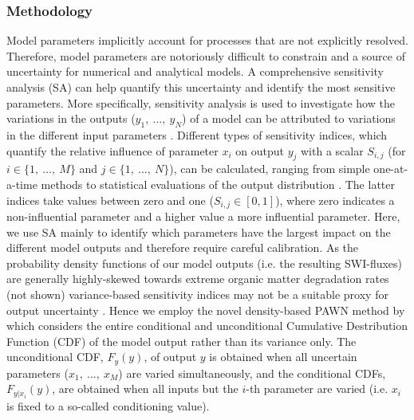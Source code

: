 \documentclass[gmd, manuscript]{copernicus}
\begin{document}
\subsubsection{Methodology}
Model parameters implicitly account for processes that are not explicitly resolved. Therefore, model parameters are notoriously difficult to constrain and a source of uncertainty for numerical and analytical models. 
A comprehensive sensitivity analysis (SA) can help quantify this uncertainty and identify the most sensitive parameters. More specifically, sensitivity analysis is used to investigate how the variations in the outputs 
($y_1,\ ...,\ y_N$) of a model can be attributed to variations in the different input parameters \citep[$x_1,\ ...,\ x_M$,][]{pianosi_sensitivity_2016}. 
Different types of sensitivity indices, which quantify the relative influence of parameter $x_i$ on output $y_j$ with a scalar $S_{i,j}$ 
(for $i \in \{1,\ ...,\ M \}$ and $j \in \{1,\ ...,\ N \}$), can be calculated, ranging from simple one-at-a-time methods to statistical evaluations of the output 
distribution \citep[e.g. variance-based or density-based approaches][]{pianosi_sensitivity_2016}. The latter indices 
take values between zero and one ($S_{i,j} \in [0, 1]$), where zero indicates a non-influential parameter and a higher value a more influential parameter. 
Here, we use SA mainly to identify which parameters have the largest impact on the different model outputs and therefore require careful calibration. 
As the probability density functions of our model outputs (i.e. the resulting SWI-fluxes) are generally highly-skewed towards extreme organic matter degradation rates (not shown) variance-based sensitivity indices 
may not be a suitable proxy for output uncertainty \citep{pianosi_sensitivity_2016}. 
Hence we employ the novel density-based PAWN method by \citet{pianosi_simple_2015} which considers the entire conditional and unconditional Cumulative Destribution Function (CDF) of the model output
rather than its variance only. The unconditional CDF, $F_y(y)$, of output $y$ is obtained when all uncertain parameters ($x_1,\ ...,\ x_M$) are varied simultaneously, 
and the conditional CDFs, $F_{y|x_i}(y)$, are obtained when all inputs but the $i$-th parameter are varied (i.e. $x_i$ is fixed to a so-called conditioning value). 
\end{document}
